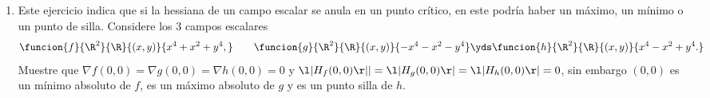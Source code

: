 \documentclass[a4,11pt]{aleph-examen}
\begin{document}
\begin{preguntas}
\begin{respuesta}
\begin{respuesta}
\begin{respuesta}
\begin{enumerate}
\begin{respuesta}
    Para hallar los puntos críticos se analiza el gradiente de la función $f$
    \[
        \nabla f(x,y)=(2x-1,2y-1)
    \]
    el cual es igual a (0,0) para $(x,y)=(\frac{1}{2},\frac{1}{2})$.
    La frontera se puede expresar como
    \[
        \funcion{r}{[0,2\pi]}{\R^2}{t}{(\sen t, \cos t)}
    \]
    entonces $f(r(t))=2-\cos t-\sen t$, $t \in [0,2\pi]$, los puntos críticos de la frontera serán los puntos para los que $f'(r(t))=0$.
    \[
        f'(r(t))=\sen t - \cos t,
    \]
    así los puntos críticos son $t=\dfrac{\pi}{4}$, $t=\dfrac{5\pi}{4}$ y los extremos $t=0$ y $t=2\pi$.
        
    Los valores de la función $f$ en los puntos críticos son
       
    \begin{align*}     
        f\left (\frac{1}{2},\frac{1}{2} \right )&=\frac{1}{2}\\
        f\left(r\left(\frac{\pi}{4}\right)\right)&=f\left (\frac{\sqrt[]{2}}{2},\frac{\sqrt[]{2}}{2} \right )=2-\sqrt[]{2}\\
        f\left(r\left(\frac{5\pi}{4}\right)\right)&=f\left (-\frac{\sqrt[]{2}}{2},-\frac{\sqrt[]{2}}{2} \right )=2+\sqrt[]{2}\\
        f(r(0))&=f(r(2\pi))=f(0,1)=1.
    \end{align*}
    Comparando todos los valores se puede ver que el mínimo absoluto esta en $\left (\frac{1}{2},\frac{1}{2} \right )$ y el máximo absoluto en $\left (-\frac{\sqrt[]{2}}{2},-\frac{\sqrt[]{2}}{2} \right )$.
\end{respuesta}


\item 
    Este ejercicio indica que si la hessiana de un campo escalar se anula en un punto crítico, en este podría haber un máximo, un mínimo o un punto de silla. Considere los 3 campos escalares
    \[
        \funcion{f}{\R^2}{\R}{(x,y)}{x^4+x^2+y^4,}
        \qquad
        \funcion{g}{\R^2}{\R}{(x,y)}{-x^4-x^2-y^4}
        \yds
        \funcion{h}{\R^2}{\R}{(x,y)}{x^4-x^2+y^4.}
    \]
    Muestre que $\nabla f(0,0)=\nabla g(0,0)=\nabla h(0,0)=0$ y $\l|H_f(0,0)\r||=\l|H_g(0,0)\r|=\l|H_h(0,0)\r|=0$, sin embargo $(0,0)$ es un mínimo absoluto de $f$, es un máximo absoluto de $g$ y es un punto silla de $h$. 


\end{enumerate}
\end{respuesta}
\end{respuesta}
\end{respuesta}
\end{preguntas}
\end{document}
